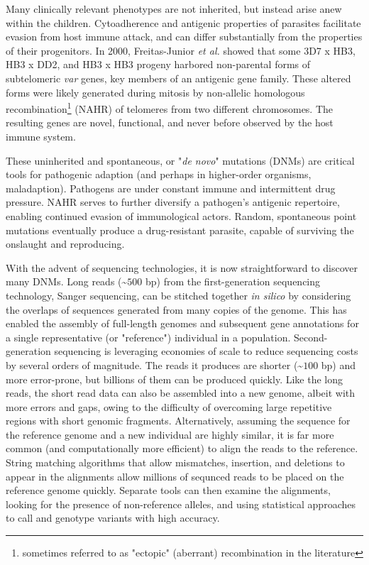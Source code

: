 Many clinically relevant phenotypes are not inherited, but instead arise anew within the children.  Cytoadherence and antigenic properties of parasites facilitate evasion from host immune attack, and can differ substantially from the properties of their progenitors.  In 2000, Freitas-Junior \textit{et al.} showed that some 3D7 x HB3, HB3 x DD2, and HB3 x HB3 progeny harbored non-parental forms of subtelomeric \textit{var} genes, key members of an antigenic gene family\cite{FreitasJunior:2000cp}.  These altered forms were likely generated during mitosis by non-allelic homologous recombination\footnote{sometimes referred to as "ectopic" (aberrant) recombination in the literature} (NAHR) of telomeres from two different chromosomes\cite{Duffy:2009cc}.  The resulting genes are novel, functional, and never before observed by the host immune system.

These uninherited and spontaneous, or "\textit{de novo}" mutations (DNMs) are critical tools for pathogenic adaption (and perhaps in higher-order organisms, maladaption).  Pathogens are under constant immune and intermittent drug pressure.  NAHR serves to further diversify a pathogen's antigenic repertoire, enabling continued evasion of immunological actors.  Random, spontaneous point mutations eventually produce a drug-resistant parasite, capable of surviving the onslaught and reproducing.

With the advent of sequencing technologies, it is now straightforward to discover many DNMs.  Long reads (\textasciitilde $500$ bp) from the first-generation sequencing technology, Sanger sequencing, can be stitched together \textit{in silico} by considering the overlaps of sequences generated from many copies of the genome\cite{Myers:1995vma}.  This has enabled the assembly of full-length genomes and subsequent gene annotations for a single representative (or "reference") individual in a population.  Second-generation sequencing is leveraging economies of scale to reduce sequencing costs by several orders of magnitude\cite{Mardis:2011cr}.  The reads it produces are shorter (\textasciitilde $100$ bp) and more error-prone, but billions of them can be produced quickly.  Like the long reads, the short read data can also be assembled into a new genome, albeit with more errors and gaps, owing to the difficulty of overcoming large repetitive regions with short genomic fragments\cite{Schatz:2010if}.  Alternatively, assuming the sequence for the reference genome and a new individual are highly similar, it is far more common (and computationally more efficient) to align the reads to the reference\cite{Flicek:2009dl}.  String matching algorithms that allow mismatches, insertion, and deletions to appear in the alignments allow millions of sequnced reads to be placed on the reference genome quickly.  Separate tools can then examine the alignments, looking for the presence of non-reference alleles, and using statistical approaches to call and genotype variants with high accuracy\cite{Nielsen:2011kz}.

